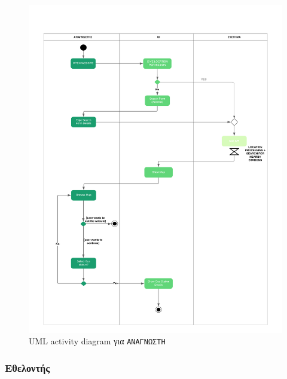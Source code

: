 \begin{figure}
	\centering\includegraphics[width = \linewidth]{uml/reader.png}
	\caption{UML activity diagram για \texttt{ΑΝΑΓΝΩΣΤΗ}}
\end{figure}


\subsubsection*{Εθελοντής}

